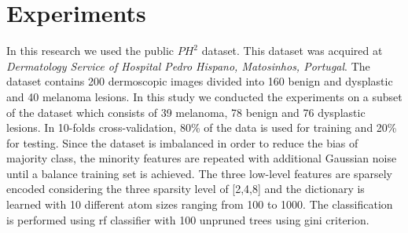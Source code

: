 \section{Experiments}
\label{sec:exp}
In this research we used the public $PH^2$ dataset. 
This dataset was acquired at \textit{Dermatology Service of Hospital Pedro Hispano, Matosinhos, Portugal}. 
The dataset contains 200 dermoscopic images divided into 160 benign and dysplastic and 40 melanoma lesions. 
In this study we conducted the experiments on a subset of the dataset which consists of 39 melanoma, 78 benign and 76 dysplastic lesions.
In 10-folds cross-validation, 80\% of the data is used for training and 20\% for testing.
Since the dataset is imbalanced in order to reduce the bias of majority class, the minority features are repeated with additional Gaussian noise until a balance training set is achieved.
The three low-level features are sparsely encoded considering the three sparsity level of [2,4,8] and the dictionary is learned with 10 different atom sizes ranging from 100 to 1000. 
The classification is performed using \ac{rf} classifier with 100 unpruned trees using gini criterion. 
 
